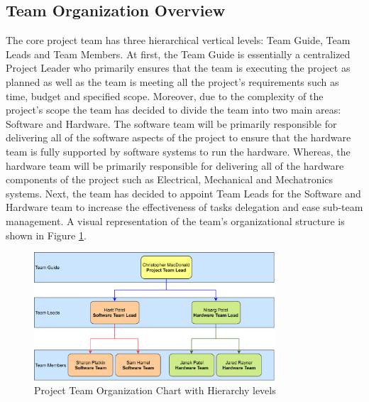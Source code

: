\documentclass[11pt]{article}
\begin{document}
\subsection{Team Organization Overview}
The core project team has three hierarchical vertical levels: Team Guide, Team Leads and Team Members. At first, the Team Guide is essentially a centralized Project Leader who primarily ensures that the team is executing the project as planned as well as the team is meeting all the project's requirements such as time, budget and specified scope. Moreover, due to the complexity of the project's scope the team has decided to divide the team into two main areas: Software and Hardware. The software team will be primarily responsible for delivering all of the software aspects of the project to ensure that the hardware team is fully supported by software systems to run the hardware. Whereas, the hardware team will be primarily responsible for delivering all of the hardware components of the project such as Electrical, Mechanical and Mechatronics systems. Next, the team has decided to appoint Team Leads for the Software and Hardware team to increase the effectiveness of tasks delegation and ease sub-team management. A visual representation of the team's organizational structure is shown in Figure \ref{fig:teamoverview}.
\begin{figure}[htbp]
   \centering
   \includegraphics[width=0.8\textwidth]{img/Team_Overview_Chart.png} %
   \caption{Project Team Organization Chart with Hierarchy levels}
   \label{fig:teamoverview}
\end{figure}
\end{document}
